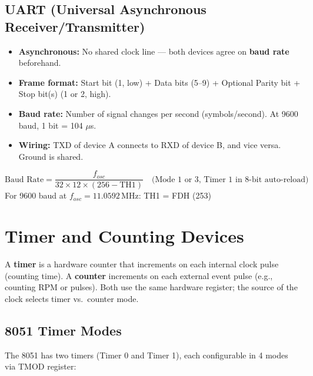 \documentclass[12pt,a4paper]{article}
\begin{document}
\subsection{UART (Universal Asynchronous Receiver/Transmitter)}
\begin{itemize}[leftmargin=*, itemsep=3pt]
  \item \textbf{Asynchronous:} No shared clock line --- both devices agree on \textbf{baud rate} beforehand.
  \item \textbf{Frame format:} Start bit (1, low) + Data bits (5--9) + Optional Parity bit + Stop bit(s) (1 or 2, high).
  \item \textbf{Baud rate:} Number of signal changes per second (symbols/second). At 9600 baud, 1 bit = 104 $\mu$s.
  \item \textbf{Wiring:} TXD of device A connects to RXD of device B, and vice versa. Ground is shared.
\end{itemize}

\begin{tcolorbox}[formulabox, title={\textbf{UART Baud Rate Formula (8051)}}]
\[
\text{Baud Rate} = \frac{f_{osc}}{32 \times 12 \times (256 - \text{TH1})}
\quad \text{(Mode 1 or 3, Timer 1 in 8-bit auto-reload)}
\]
For 9600 baud at $f_{osc} = 11.0592\,\text{MHz}$: \quad TH1 = FDH (253)
\end{tcolorbox}

\section{Timer and Counting Devices}

\begin{tcolorbox}[defbox, title={\textbf{Timer / Counter}}]
A \textbf{timer} is a hardware counter that increments on each internal clock pulse (counting time). A \textbf{counter} increments on each external event pulse (e.g., counting RPM or pulses). Both use the same hardware register; the source of the clock selects timer vs.\ counter mode.
\end{tcolorbox}

\subsection{8051 Timer Modes}

The 8051 has two timers (Timer 0 and Timer 1), each configurable in 4 modes via TMOD register:
\end{document}
